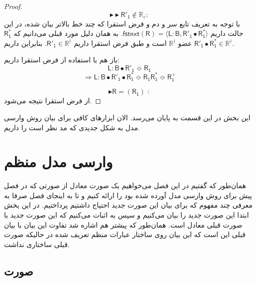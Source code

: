 \begin{proof}
	$$\blacktriangleright\blacktriangleright\mathsf{R'_1} \notin \mathbb{R_\varepsilon}:$$
با توجه به تعریف تابع سر و دم و فرض استقرا که چند خط بالاتر بیان شده، در این حالت داریم 
	$\mathsf{fstnxt(R)=\langle L:B , R'_1 \bullet R_1^* \rangle}$.
	به همان دلیل مورد قبلی می‌دانیم که $\mathsf{R_1^*}$ عضو $\mathbb{R^\nmid}$ است و طبق فرض استقرا داریم $\mathsf{R'_1} \in \mathbb{R^\nmid}$. بنابراین داریم
		$\mathsf{R'_1 \bullet R_1^*} \in \mathbb{R^\nmid}$.
		
		باز هم با استفاده از فرض استقرا داریم:
		$$\mathsf{L:B \bullet R'_1 \Bumpeq R_1}$$
		$$\Rightarrow \mathsf{L:B \bullet R'_1 \bullet R_1^* \Bumpeq R_1 R_1^* \Bumpeq R_1^+}$$
	
	$$\blacktriangleright\mathsf{R=(R_1)\;:}$$
	از فرض استقرا نتیجه می‌شود.
\end{proof}

این بخش در این قسمت به پایان می‌رسد. الان ابزارهای کافی برای بیان روش وارسی مدل به شکل جدیدی که مد نظر است را داریم.

\section{وارسی مدل منظم}
همان‌طور که گفتیم در این فصل می‌خواهیم یک صورت معادل از صورتی که در فصل پیش برای روش وارسی مدل آورده شده بود را ارائه کنیم و تا به اینجای فصل صرفا به معرفی چند مفهوم که برای بیان این صورت جدید احتیاج داشتیم پرداختیم. در این یخش ابتدا این صورت جدید را بیان می‌‌کنیم و سپس به اثبات می‌‌کنیم که این صورت جدید با صورت قبلی معادل است. همان‌طور که پیشتر هم اشاره شد تفاوت این بیان با بیان قبلی این است که این بیان روی ساختار عبارات منظم تعریف شده در حالیکه صورت قبلی ساختاری نداشت.
\subsection{صورت}

